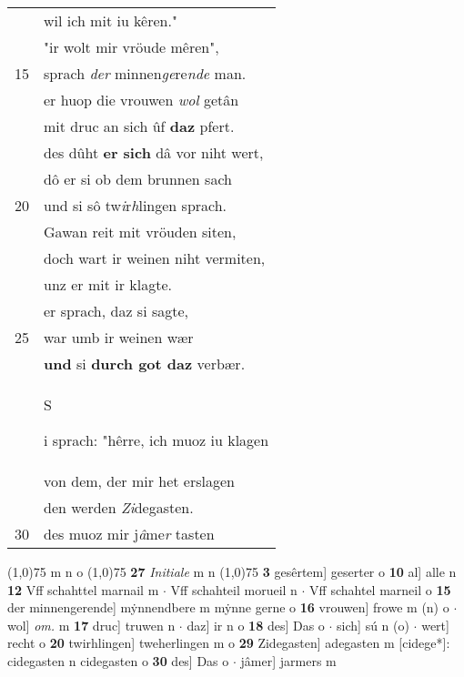 \documentclass[8pt,a4paper,notitlepage]{article}
\begin{document}
\begin{table}[ht]
\begin{minipage}[t]{0.5\linewidth}
\begin{tabular}{rl}
 & wil ich mit iu kêren."\\ 
 & "ir wolt mir vröude mêren",\\ 
15 & sprach \textit{der} minnen\textit{ge}re\textit{nde} man.\\ 
 & er huop die vrouwen \textit{wol} getân\\ 
 & mit druc an sich ûf \textbf{daz} pfert.\\ 
 & des dûht \textbf{er sich} dâ vor niht wert,\\ 
 & dô er si ob dem brunnen sach\\ 
20 & und si sô tw\textit{i}r\textit{h}lingen sprach.\\ 
 & Gawan reit mit vröuden siten,\\ 
 & doch wart ir weinen niht vermiten,\\ 
 & unz er mit ir klagte.\\ 
 & er sprach, daz si sagte,\\ 
25 & war umb ir weinen wær\\ 
 & \textbf{und} si \textbf{durch got daz} verbær.\\ 
 & \begin{large}S\end{large}i sprach: "hêrre, ich muoz iu klagen\\ 
 & von dem, der mir het erslagen\\ 
 & den werden \textit{Zi}degasten.\\ 
30 & des muoz mir j\textit{â}me\textit{r} tasten\\ 
\end{tabular}
\scriptsize
\line(1,0){75} \newline
m n o \newline
\line(1,0){75} \newline
\textbf{27} \textit{Initiale} m n  \newline
\line(1,0){75} \newline
\textbf{3} gesêrtem] geserter o \textbf{10} al] alle n \textbf{12} Vff schahttel marnail m  $\cdot$ Vff schahteil morueil n  $\cdot$ Vff schahtel marneil o \textbf{15} der minnengerende] mẏnnendbere m mẏnne gerne o \textbf{16} vrouwen] frowe m (n) o  $\cdot$ wol] \textit{om.} m \textbf{17} druc] truwen n  $\cdot$ daz] ir n o \textbf{18} des] Das o  $\cdot$ sich] sú n (o)  $\cdot$ wert] recht o \textbf{20} twirhlingen] tweherlingen m o \textbf{29} Zidegasten] adegasten m [cidege*]: cidegasten n cidegasten o \textbf{30} des] Das o  $\cdot$ jâmer] jarmers m \newline
\end{minipage}
\end{table}
\end{document}
